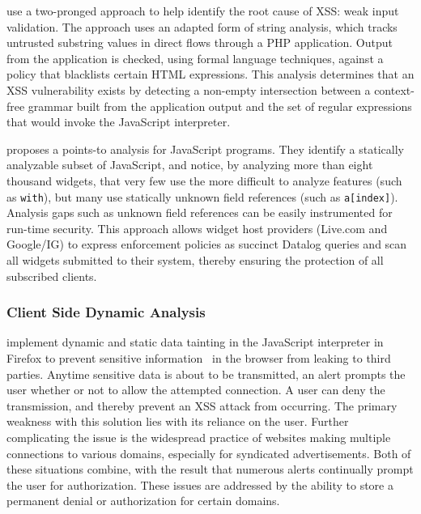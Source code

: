 \documentclass{acmtrans2m}
\begin{document}
 use a two-pronged approach to help identify the root cause of XSS: weak input validation.
The approach uses an adapted form of string analysis, which tracks untrusted substring values in direct flows through a PHP application.
Output from the application is checked, using formal language techniques, against a policy that blacklists certain HTML expressions.
This analysis determines that an XSS vulnerability exists by detecting a non-empty intersection between a context-free grammar built from the application output and the set of regular expressions that would invoke the JavaScript interpreter.

 proposes a points-to analysis for JavaScript programs.
They identify a statically analyzable subset of JavaScript, and notice, by analyzing more than eight thousand widgets, that very few use the more difficult to analyze features (such as \texttt{with}), but many use statically unknown field references (such as \texttt{a[index]}).
Analysis gaps such as unknown field references can be easily instrumented for run-time security.
This approach allows widget host providers (Live.com and Google/IG) to express enforcement policies as succinct Datalog queries and scan all widgets submitted to their system, thereby ensuring the protection of all subscribed clients.

\subsubsection*{Client Side Dynamic Analysis}

 implement dynamic and static data tainting in the JavaScript interpreter in Firefox to prevent sensitive information~\cite{mozillaAdvancedTopics} in the browser from leaking to third parties.
Anytime sensitive data is about to be transmitted, an alert prompts the user whether or not to allow the attempted connection.
A user can deny the transmission, and thereby prevent an XSS attack from occurring.
The primary weakness with this solution lies with its reliance on the user.
Further complicating the issue is the widespread practice of websites making multiple connections to various domains, especially for syndicated advertisements.
Both of these situations combine, with the result that numerous alerts continually prompt the user for authorization.
These issues are addressed by the ability to store a permanent denial or authorization for certain domains.
\end{document}
